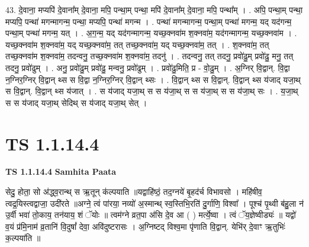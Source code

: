\documentclass[17pt]{extarticle}
\begin{document}
43. दे॒वाना॒ मप्यपि॑ दे॒वाना᳚म् दे॒वाना॒ मपि॒ पन्था॒म् पन्था॒ मपि॑ दे॒वाना᳚म् दे॒वाना॒ मपि॒ पन्था᳚म् । . अपि॒ पन्था॒म् पन्था॒ मप्यपि॒ पन्था॑ मगन्मागन्म॒ पन्था॒ मप्यपि॒ पन्था॑ मगन्म । . पन्था॑ मगन्मागन्म॒ पन्था॒म् पन्था॑ मगन्म॒ यद् यद॑गन्म॒ पन्था॒म् पन्था॑ मगन्म॒ यत् । . अ॒ग॒न्म॒ यद् यद॑गन्मागन्म॒ यच्छ॒क्नवा॑म श॒क्नवा॑म॒ यद॑गन्मागन्म॒ यच्छ॒क्नवा॑म । . यच्छ॒क्नवा॑म श॒क्नवा॑म॒ यद् यच्छ॒क्नवा॑म॒ तत् तच्छ॒क्नवा॑म॒ यद् यच्छ॒क्नवा॑म॒ तत् । . श॒क्नवा॑म॒ तत् तच्छ॒क्नवा॑म श॒क्नवा॑म॒ तदन्वनु॒ तच्छ॒क्नवा॑म श॒क्नवा॑म॒ तदनु॑ । . तदन्वनु॒ तत् तदनु॒ प्रवो॑ढु॒म् प्रवो॑ढु॒ मनु॒ तत् तदनु॒ प्रवो॑ढुम् । . अनु॒ प्रवो॑ढु॒म् प्रवो॑ढु॒ मन्वनु॒ प्रवो॑ढुम् । . प्रवो॑ढु॒मिति॒ प्र - वो॒ढु॒म् । . अ॒ग्निर् वि॒द्वान्. वि॒द्वा न॒ग्निर॒ग्निर् वि॒द्वान् थ्स स वि॒द्वा न॒ग्निर॒ग्निर् वि॒द्वान् थ्सः । . वि॒द्वान् थ्स स वि॒द्वान्. वि॒द्वान् थ्स य॑जाद् यजा॒थ् स वि॒द्वान्. वि॒द्वान् थ्स य॑जात् । . स य॑जाद् यजा॒थ् स स य॑जा॒थ् स स य॑जा॒थ् स स य॑जा॒थ् सः । . य॒जा॒थ् स स य॑जाद् यजा॒थ् सेदिथ् स य॑जाद् यजा॒थ् सेत् । \newline
\pagebreak
{}

\section{ TS 1.1.14.4 }

\textbf{TS 1.1.14.4 } \newline
\textbf{Samhita Paata} \newline

सेदु॒ होता॒ सो अ॑द्ध्व॒रान्थ् स ऋ॒तून् क॑ल्पयाति ॥यद्वाहि॑ष्ठं॒ तद॒ग्नये॑ बृ॒हद॑र्च विभावसो । महि॑षीव॒ त्वद्र॒यिस्त्वद्वाजा॒ उदी॑रते ॥अग्ने॒ त्वं पा॑रया॒ नव्यो॑ अ॒स्मान्थ् स्व॒स्तिभि॒रति॑ दु॒र्गाणि॒ विश्वा᳚ । पूश्च॑ पृ॒थ्वी ब॑हु॒ला न॑ उ॒र्वी भवा॑ तो॒काय॒ तन॑याय॒ शं ॅयोः ॥ त्वम॑ग्ने व्रत॒पा अ॑सि दे॒व आ ( ) मर्त्ये॒ष्वा । त्वं ॅय॒ज्ञेष्वीड्यः॑ ॥ यद्वो॑ व॒यं प्र॑मि॒नाम॑ व्र॒तानि॑ वि॒दुषां᳚ देवा॒ अवि॑दुष्टरासः । अ॒ग्निष्टद् विश्व॒मा पृ॑णाति वि॒द्वान्. येभि॑र् दे॒वाꣳ ऋ॒तुभिः॑ क॒ल्पया॑ति ॥ \newline
\end{document}

